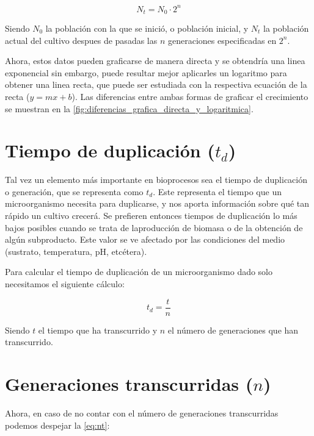 \begin{equation}\label{eq:nt}
    N_{t} = N_{0} \cdot 2^{n}
\end{equation}

Siendo $N_{0}$ la población con la que se inició, o población inicial, y $N_{t}$ la población actual del cultivo despues de pasadas las $n$ generaciones especificadas en $2^{n}$. 

Ahora, estos datos pueden graficarse de manera directa y se obtendría una linea exponencial sin embargo, puede resultar mejor aplicarles un logaritmo para obtener una linea recta, que puede ser estudiada con la respectiva ecuación de la recta ($y=mx+b$). Las diferencias entre ambas formas de graficar el crecimiento se muestran en la \autoref{fig:diferencias_grafica_directa_y_logaritmica}.


    


\section{Tiempo de duplicación ($t_{d}$)}

Tal vez un elemento más importante en bioprocesos sea el tiempo de duplicación o generación, que se representa como $t_{d}$. Este representa el tiempo que un microorganismo necesita para duplicarse, y nos aporta información sobre qué tan rápido un cultivo crecerá. Se prefieren entonces tiempos de duplicación lo más bajos posibles cuando se trata de laproducción de biomasa o de la obtención de algún subproducto. Este valor se ve afectado por las condiciones del medio (sustrato, temperatura, pH, etcétera).

Para calcular el tiempo de duplicación de un microorganismo dado solo necesitamos el siguiente cálculo:

\begin{equation}
    t_{d} = \frac{t}{n}
\end{equation}

Siendo $t$ el tiempo que ha transcurrido y $n$ el número de generaciones que han transcurrido.

\section{Generaciones transcurridas ($n$)}

Ahora, en caso de no contar con el número de generaciones transcurridas podemos despejar la \autoref{eq:nt}:

